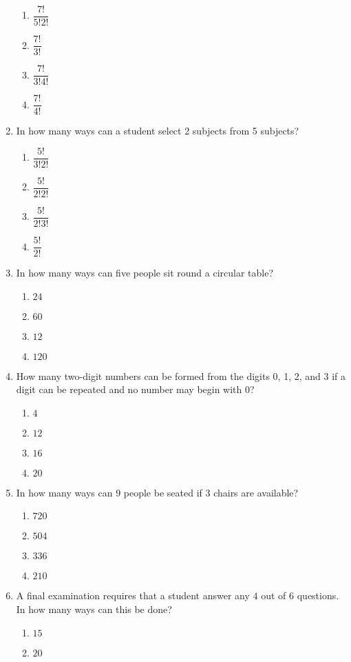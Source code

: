 \begin{multicols}{2}
\begin{enumerate}[label={\arabic*.}]
\begin{enumerate}[label={\Alph*.}]
	\item \(\dfrac{7!}{5!2!}\)
	\item \(\dfrac{7!}{3!}\)
	\item \(\dfrac{7!}{3!4!}\)
	\item \(\dfrac{7!}{4!}\)
	\end{enumerate}
\item In how many ways can a student select 2 subjects from 5 subjects?
	\begin{enumerate}[label={\Alph*.}]
	\item \(\dfrac{5!}{3!2!}\)
	\item \(\dfrac{5!}{2!2!}\)
	\item \(\dfrac{5!}{2!3!}\)
	\item \(\dfrac{5!}{2!}\)
	\end{enumerate}
\item In how many ways can five people sit round a circular table?
	\begin{enumerate}[label={\Alph*.}]
	\item \(24\)
	\item \(60\)
	\item \(12\)
	\item \(120\)
	\end{enumerate}
\item How many two-digit numbers can be formed from the digits 0, 1, 2, and 3 if a digit can be repeated and no number may begin with 0?
	\begin{enumerate}[label={\Alph*.}]
	\item \(4\)
	\item \(12\)
	\item \(16\)
	\item \(20\)
	\end{enumerate}
\item In how many ways can \(9\) people be seated if \(3\) chairs are available?
	\begin{enumerate}[label={\Alph*.}]
	\item \(720\)
	\item \(504\)
	\item \(336\)
	\item \(210\)
	\end{enumerate}
\item A final examination requires that a student answer any \(4\) out of \(6\) questions. In how many ways can this be done?
	\begin{enumerate}[label={\Alph*.}]
	\item \(15\)
	\item \(20\)

\end{enumerate}
\end{enumerate}
\end{multicols}
